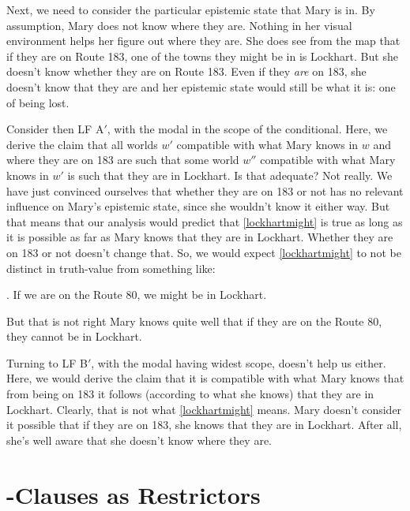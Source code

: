 Next, 
%
%
% 
we need to consider the particular epistemic state that Mary is in. By assumption, Mary does not know where they are. Nothing in her visual environment helps her figure out where they are. She does see from the map that if they are on Route 183, one of the towns they might be in is Lockhart. But she doesn't know whether they are on Route 183. Even if they \emph{are} on 183, she doesn't know that they are and her epistemic state would still be what it is: one of being lost.

Consider then LF A$'$, with the modal in the scope of the conditional. Here, we derive the claim that all worlds $w'$ compatible with what Mary knows in $w$ and where they are on 183 are such that some world $w''$ compatible with what Mary knows in $w'$ is such that they are in Lockhart. Is that adequate? Not really. We have just convinced ourselves that whether they are on 183 or not has no relevant influence on Mary's epistemic state, since she wouldn't know it either way. But that means that our analysis would predict that \ref{lockhartmight} is true as long as it is possible as far as Mary knows that they are in Lockhart. Whether they are on 183 or not doesn't change that. So, we would expect \ref{lockhartmight} to not be distinct in truth-value from something like:

\ex. If we are on the Route 80, we might be in Lockhart.

But that is not right \dash Mary knows quite well that if they are on the Route 80, they cannot be in Lockhart. 

Turning to LF B$'$, with the modal having widest scope, doesn't help us either. Here, we would derive the claim that it is compatible with what Mary knows that from being on 183 it follows (according to what she knows) that they are in Lockhart. Clearly, that is not what \ref{lockhartmight} means. Mary doesn't consider it possible that if they are on 183, she knows that they are in Lockhart. After all, she's well aware that she doesn't know where they are.

\section{-Clauses as Restrictors}

